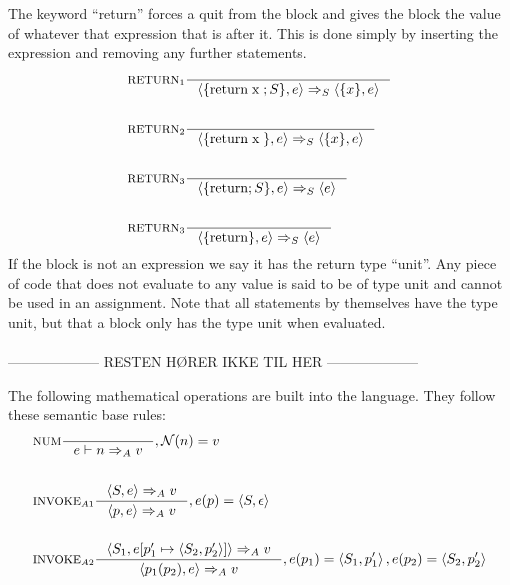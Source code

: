 The keyword \enquote{return} forces a quit from the block and gives the block the value of whatever that expression that is after it. This is done simply by inserting the expression and removing any further statements.
\begin{align*}
&\inference[$\text{RETURN}_{1}$]{}
                   {\Braket{\{\Treturn \Tx;S\},e} \Rightarrow_S \Braket{\{x\},e}}
\\\\
&\inference[$\text{RETURN}_{2}$]{}
                   {\Braket{\{\Treturn \Tx\},e} \Rightarrow_S \Braket{\{x\},e}}
\\\\
&\inference[$\text{RETURN}_{3}$]{}
                   {\Braket{\{\Treturn;S\},e} \Rightarrow_S \Braket{e}}
\\\\
&\inference[$\text{RETURN}_{3}$]{}
                   {\Braket{\{\Treturn\},e} \Rightarrow_S \Braket{e}}
\end{align*}
If the block is not an expression we say it has the return type \enquote{unit}. Any piece of code that does not evaluate to any value is said to be of type unit and cannot be used in an assignment. Note that all statements by themselves have the type unit, but that a block only has the type unit when evaluated.
\\\\
-------------------- RESTEN HØRER IKKE TIL HER --------------------

The following mathematical operations are built into the language. They follow these semantic base rules:
\begin{align*}
&\inference[NUM]{}
                  {e \vdash n \Rightarrow_A v}
                  {, \mathcal{N}(n) = v}
\\\\
&\inference[$\text{INVOKE}_{A1}$]{\Braket{S,e} \Rightarrow_A v}
                  {\Braket{p,e} \Rightarrow_A v}
                  {,e(p) = \Braket{S,\epsilon}}
\\\\
&\inference[$\text{INVOKE}_{A2}$]{\Braket{S_1,e[p_1' \mapsto \Braket{S_2,p_2'}]} \Rightarrow_A v}
                  {\Braket{p_1(p_2),e} \Rightarrow_A v}
                  {,e(p_1) = \Braket{S_1,p_1'}, e(p_2) = \Braket{S_2,p_2'}}
\\\\
\end{align*}


